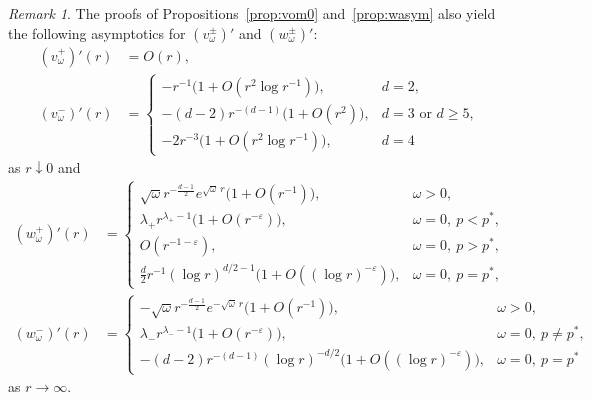 \documentclass[12pt, a4paper, reqno]{amsart}
\numberwithin{equation}{section}
\theoremstyle{definition}
\theoremstyle{remark}
\newtheorem{remark}[theorem]{Remark}
\begin{document}
\begin{remark}\label{rem:wprime}
The proofs of Propositions~\ref{prop:vom0} and~\ref{prop:wasym} also yield the following asymptotics for $(v_\omega^\pm)'$ and $(w_\omega^\pm)'$:
\begin{align*}
    (v_\omega^+)'(r)
   &=O(r),
\\  (v_\omega^-)'(r)
   &=\begin{cases}
    -r^{-1}\bigl(1+O(r^2\log r^{-1})\bigr), & d=2,
\\  -(d-2)r^{-(d-1)}\bigl(1+O(r^{2})\bigr), & d=3 \text{ or } d\ge 5,
\\  -2r^{-3}\bigl(1+O(r^2\log r^{-1})\bigr), & d=4
   \end{cases}
\end{align*}
as $r\downarrow 0$ and
\begin{align*}
    (w_{\omega}^+)'(r)
   &=\begin{cases}
    \sqrt{\omega}r^{-\frac{d-1}{2}}e^{\sqrt{\omega}\,r}\bigl(1+O(r^{-1})\bigr), & \omega>0,
\\  \lambda_+r^{\lambda_+-1}\bigl(1+O(r^{-\varepsilon})\bigr), & \omega=0,\ p<p^*,
\\  O(r^{-1-\varepsilon}), & \omega=0,\ p>p^*,
\\  \frac{d}{2}r^{-1}(\log r)^{d/2-1}\bigl(1+O((\log r)^{-\varepsilon})\bigr), & \omega=0,\ p=p^*,
    \end{cases}
\\  (w_{\omega}^-)'(r)
   &=\begin{cases}
    -\sqrt{\omega}r^{-\frac{d-1}{2}}e^{-\sqrt{\omega}\,r}\bigl(1+O(r^{-1})\bigr), & \omega>0,
\\  \lambda_-r^{\lambda_--1}\bigl(1+O(r^{-\varepsilon})\bigr), & \omega=0,\ p\ne p^*,
\\  -(d-2)r^{-(d-1)}(\log r)^{-d/2}\bigl(1+O((\log r)^{-\varepsilon})\bigr), & \omega=0,\ p=p^*
   \end{cases}
\end{align*}
as $r\to\infty$.
\end{remark}

\end{document}

